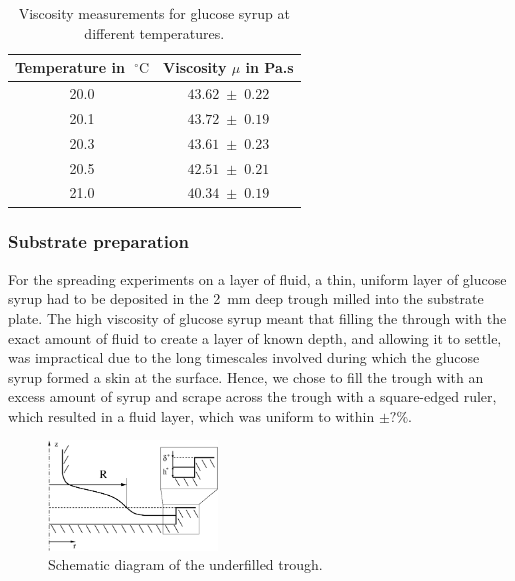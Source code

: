 \documentclass[aip,graphicx]{revtex4-1}
\newcommand{\degC}[1]{#1 \; ^{\circ} \text{C}}
\begin{document}
{\renewcommand{\arraystretch}{1.2}
 \begin{table}[!ht]
 \begin{center}
 \begin{tabular}{c | c}
  Temperature in $\degC{}$ & Viscosity $\mu$ in Pa.s \\ 
   \hline
   20.0 & $43.62 \; \pm \; 0.22$ \\
   20.1 & $43.72 \; \pm \; 0.19$ \\
   20.3 & $43.61 \; \pm \; 0.23$ \\
   20.5 & $42.51 \; \pm \; 0.21$ \\
   21.0 & $40.34 \; \pm \; 0.19$\\
 \end{tabular}
 \caption{Viscosity measurements for glucose syrup at different temperatures.}
 \label{tab:glucose_viscosity}
 \end{center}
 \end{table}}


\subsubsection{Substrate preparation}
\label{sec:creating_layer}

For the spreading experiments on a layer of fluid, a thin, uniform layer of glucose syrup had to be deposited in the 2~mm deep trough milled into the substrate plate. The high viscosity of glucose syrup meant that filling the through with the exact amount of fluid to create a layer of known depth, and allowing it to settle, was impractical due to the long timescales involved during which the glucose syrup formed a skin at the surface. Hence, we chose to fill the trough with an excess amount of syrup and scrape across the trough with a square-edged ruler, which resulted in a fluid  layer, which was  uniform to within {\bf $\pm ?\%$}.
 
\begin{figure}[!ht]
\centering
\includegraphics[width=0.4\textwidth]{figures/axisym_drop_nozzle_gap.eps}
\caption{Schematic diagram of the underfilled trough.}
\label{fig:axisym_drop_nozzle_gap}
\end{figure}
 
\end{document}
